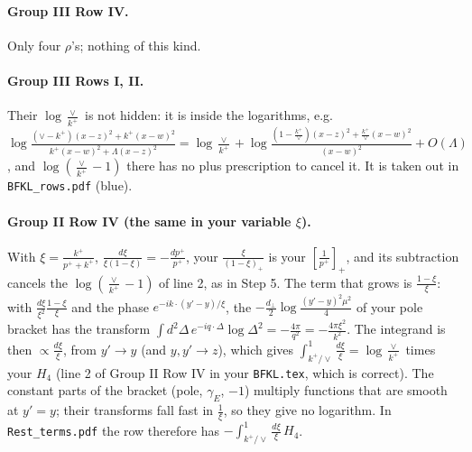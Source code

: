 \documentclass[10pt]{article}
\numberwithin{equation}{section}
\begin{document}
\paragraph{Group III Row IV.} Only four $\rho$'s; nothing of this kind.
\paragraph{Group III Rows I, II.} Their $\log\frac{\vee}{k^+}$ is not hidden: it is inside the logarithms, e.g.\ $\log\frac{(\vee-k^{+})(x-z)^{2}+k^{+}(x-w)^{2}}{k^{+}(x-w)^{2}+\Lambda(x-z)^{2}}=\log\frac{\vee}{k^+}+\log\frac{(1-\frac{k^+}{\vee})(x-z)^2+\frac{k^+}{\vee}(x-w)^2}{(x-w)^2}+O(\Lambda)$, and $\log(\frac{\vee}{k^+}-1)$ there has no plus prescription to cancel it. It is taken out in \texttt{BFKL\_rows.pdf} (blue).

\paragraph{Group II Row IV (the same in your variable $\xi$).} With $\xi=\frac{k^+}{p^++k^+}$, $\frac{d\xi}{\xi(1-\xi)}=-\frac{dp^+}{p^+}$, your $\frac{\xi}{(1-\xi)_+}$ is your $[\frac{1}{p^+}]_+$, and its subtraction cancels the $\log(\frac{\vee}{k^+}-1)$ of line 2, as in Step 5. The term that grows is $\frac{1-\xi}{\xi}$: with $\frac{d\xi}{\xi^2}\frac{1-\xi}{\xi}$ and the phase $e^{-ik\cdot(y'-y)/\xi}$, the $-\frac{d_\perp}{2}\log\frac{(y'-y)^2\mu^2}{4}$ of your pole bracket has the transform $\int d^2\Delta\,e^{-iq\cdot\Delta}\log\Delta^2=-\frac{4\pi}{q^2}=-\frac{4\pi\xi^2}{k^2}$. The integrand is then $\propto\frac{d\xi}{\xi}$, from $y'\to y$ (and $y,y'\to z$), which gives $\int_{k^+/\vee}^1\frac{d\xi}{\xi}=\log\frac{\vee}{k^+}$ times your $H_4$ (line 2 of Group II Row IV in your \texttt{BFKL.tex}, which is correct). The constant parts of the bracket (pole, $\gamma_E$, $-1$) multiply functions that are smooth at $y'=y$; their transforms fall fast in $\frac1\xi$, so they give no logarithm. In \texttt{Rest\_terms.pdf} the row therefore has $-\int_{k^+/\vee}^1\frac{d\xi}{\xi}\,H_4$.
\end{document}
